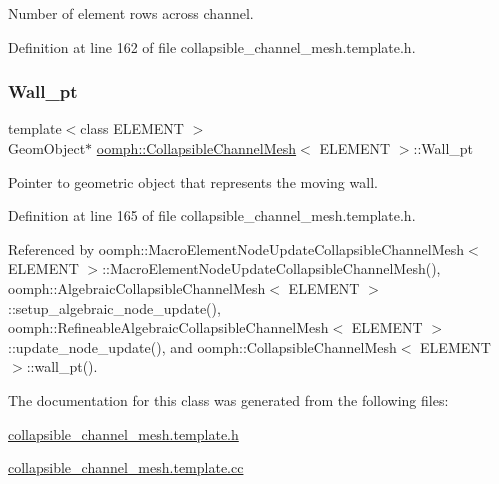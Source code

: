 Number of element rows across channel. 



Definition at line 162 of file collapsible\+\_\+channel\+\_\+mesh.\+template.\+h.

\mbox{\label{classoomph_1_1CollapsibleChannelMesh_a2457ac1492c962b0a3d962b13b51ea6e}} 
\subsubsection{\texorpdfstring{Wall\+\_\+pt}{Wall\_pt}}
{\footnotesize\ttfamily template$<$class E\+L\+E\+M\+E\+NT $>$ \\
Geom\+Object$\ast$ \hyperlink{classoomph_1_1CollapsibleChannelMesh}{oomph\+::\+Collapsible\+Channel\+Mesh}$<$ E\+L\+E\+M\+E\+NT $>$\+::Wall\+\_\+pt\hspace{0.3cm}{\ttfamily [protected]}}



Pointer to geometric object that represents the moving wall. 



Definition at line 165 of file collapsible\+\_\+channel\+\_\+mesh.\+template.\+h.



Referenced by oomph\+::\+Macro\+Element\+Node\+Update\+Collapsible\+Channel\+Mesh$<$ E\+L\+E\+M\+E\+N\+T $>$\+::\+Macro\+Element\+Node\+Update\+Collapsible\+Channel\+Mesh(), oomph\+::\+Algebraic\+Collapsible\+Channel\+Mesh$<$ E\+L\+E\+M\+E\+N\+T $>$\+::setup\+\_\+algebraic\+\_\+node\+\_\+update(), oomph\+::\+Refineable\+Algebraic\+Collapsible\+Channel\+Mesh$<$ E\+L\+E\+M\+E\+N\+T $>$\+::update\+\_\+node\+\_\+update(), and oomph\+::\+Collapsible\+Channel\+Mesh$<$ E\+L\+E\+M\+E\+N\+T $>$\+::wall\+\_\+pt().



The documentation for this class was generated from the following files\+:\begin{DoxyCompactItemize}
\item 
\hyperlink{collapsible__channel__mesh_8template_8h}{collapsible\+\_\+channel\+\_\+mesh.\+template.\+h}\item 
\hyperlink{collapsible__channel__mesh_8template_8cc}{collapsible\+\_\+channel\+\_\+mesh.\+template.\+cc}\end{DoxyCompactItemize}
